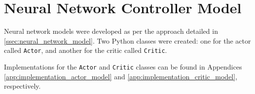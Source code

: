 \section{Neural Network Controller Model}
Neural network models were developed as per the approach detailed in \textsection \ref{ssec:neural_network_model}. Two Python classes were created: one for the actor called \verb|Actor|, and another for the critic called \verb|Critic|. 

Implementations for the \verb|Actor| and \verb|Critic| classes can be found in Appendices \ref{app:implementation_actor_model} and \ref{app:implementation_critic_model}, respectively.